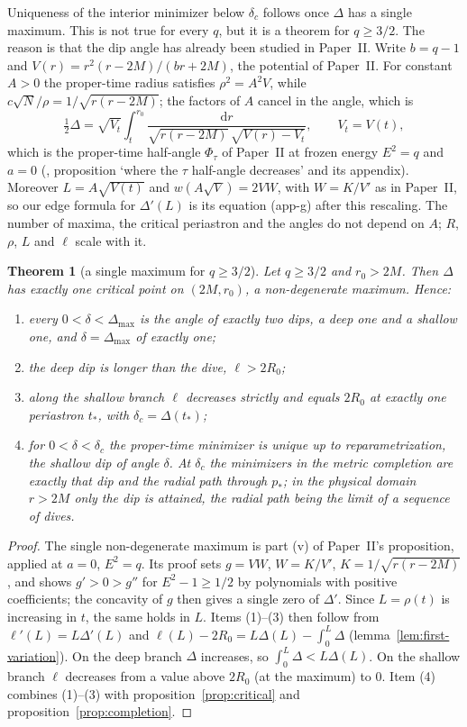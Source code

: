 \documentclass[aip,jmp,amsmath,amssymb,reprint]{revtex4-2}
\newcommand{\dd}{\mathrm{d}}
\theoremstyle{plain}
\newtheorem{theorem}{Theorem}
\theoremstyle{definition}
\begin{document}
Uniqueness of the interior minimizer below $\delta_c$ follows once $\Delta$ has a single
maximum. This is not true for every $q$, but it is a theorem for $q\ge3/2$. The reason is
that the dip angle has already been studied in Paper~II. Write $b=q-1$ and
$V(r)=r^2(r-2M)/(br+2M)$, the potential of Paper~II. For constant $A>0$ the proper-time
radius satisfies $\rho^2=A^2V$, while $c\sqrt N/\rho=1/\sqrt{r(r-2M)}$; the factors of $A$
cancel in the angle, which is
\[
  \tfrac12\Delta=\sqrt{V_t}\int_t^{r_0}\frac{\dd r}{\sqrt{r(r-2M)}\,\sqrt{V(r)-V_t}},\qquad V_t=V(t),
\]
which is the proper-time half-angle $\Phi_\tau$ of Paper~II at frozen energy $E^2=q$ and
$a=0$ (\cite{PaperTwo}, proposition `where the $\tau$ half-angle decreases' and its appendix).
Moreover $L=A\sqrt{V(t)}$ and $w(A\sqrt V)=2VW$, with $W=K/V'$ as in Paper~II, so our edge
formula for $\Delta'(L)$ is its equation (app-g) after this rescaling. The number of maxima,
the critical periastron and the angles do not depend on $A$; $R$, $\rho$, $L$ and $\ell$ scale
with it.

\begin{theorem}[a single maximum for $q\ge3/2$]\label{thm:single-max}
Let $q\ge3/2$ and $r_0>2M$. Then $\Delta$ has exactly one critical point on $(2M,r_0)$, a
non-degenerate maximum. Hence:
\begin{enumerate}
\item every $0<\delta<\Delta_{\max}$ is the angle of exactly two dips, a deep one and a
  shallow one, and $\delta=\Delta_{\max}$ of exactly one;
\item the deep dip is longer than the dive, $\ell>2R_0$;
\item along the shallow branch $\ell$ decreases strictly and equals $2R_0$ at exactly one
  periastron $t_*$, with $\delta_c=\Delta(t_*)$;
\item for $0<\delta<\delta_c$ the proper-time minimizer is unique up to reparametrization,
  the shallow dip of angle $\delta$. At $\delta_c$ the minimizers in the metric completion are
  exactly that dip and the radial path through $p_*$; in the physical domain $r>2M$ only the
  dip is attained, the radial path being the limit of a sequence of dives.
\end{enumerate}
\end{theorem}

\begin{proof}
The single non-degenerate maximum is part (v) of Paper~II's proposition, applied at $a=0$,
$E^2=q$. Its proof sets $g=VW$, $W=K/V'$, $K=1/\sqrt{r(r-2M)}$, and shows $g'>0>g''$ for
$E^2-1\ge1/2$ by polynomials with positive coefficients; the concavity of $g$ then gives a
single zero of $\Delta'$.
Since $L=\rho(t)$ is increasing in $t$, the same holds in $L$. Items (1)--(3) then follow from
$\ell'(L)=L\Delta'(L)$ and $\ell(L)-2R_0=L\Delta(L)-\int_0^L\Delta$
(lemma~\ref{lem:first-variation}). On the deep branch $\Delta$ increases, so
$\int_0^L\Delta<L\Delta(L)$. On the shallow branch $\ell$ decreases from a value above $2R_0$
(at the maximum) to $0$. Item (4) combines (1)--(3) with proposition~\ref{prop:critical} and
proposition~\ref{prop:completion}.
\end{proof}
\end{document}
